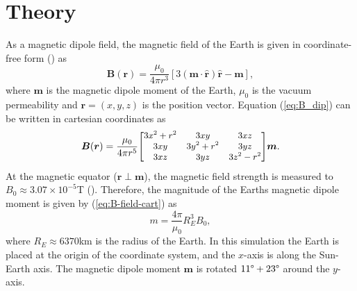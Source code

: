 \section{Theory}

As a magnetic dipole field, the magnetic field of the Earth is given in coordinate-free form (\cite{griffiths_2024}) as 
\begin{equation}
    \bm B ( \bm r) = \frac{\mu_0}{4\pi r^3} [3(\bm m \cdot \hat{\bm r})\hat{\bm r} - \bm m],
    \label{eq:B_dip}
\end{equation}
where $\bm{m}$ is the magnetic dipole moment of the Earth, $\mu_0$ is the vacuum permeability and $\bm{r} = (x,y,z)$ is the position vector. 
Equation (\ref{eq:B_dip}) can be written in cartesian coordinates as 
\begin{equation}
    \bm{B}(\bm{r}) =\frac{\mu_0}{4\pi r^5} 
    \small{\begin{bmatrix}
        3x^2 + r^2 & 3xy & 3xz \\
        3xy & 3y^2 + r^2 & 3yz \\
        3xz & 3yz & 3z^2 - r^2
    \end{bmatrix}} \bm{m}.
    \label{eq:B-field-cart}
\end{equation}
At the magnetic equator ($\bm{r} \perp \bm{m}$), the magnetic field strength is measured to $B_0 \approx 3.07\times 10^{-5}$T (\cite{soni_2021}).
Therefore, the magnitude of the Earths magnetic dipole moment is given by (\ref{eq:B-field-cart}) as 
\begin{equation}
    m = \frac{4\pi}{\mu_0} R_E^3 B_0,
\end{equation}
where $R_E\approx6370$km is the radius of the Earth. 
In this simulation the Earth is placed at the origin of the coordinate system, and the $x$-axis is along the Sun-Earth axis. 
The magnetic dipole moment $\bm{m}$ is rotated $11\degree + 23\degree$ around the $y$-axis.

